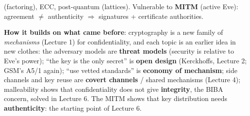 \begin{recapbox}[title={Exam-ready recap --- Lecture 5: Applied cryptography}]
\begin{itemize}
        (factoring), ECC, post-quantum (lattices). Vulnerable to \textbf{MITM} (active Eve):
        agreement $\neq$ authenticity $\Rightarrow$ signatures + certificate authorities.
\end{itemize}
\textbf{How it builds on what came before}: cryptography is a new family of \emph{mechanisms}
(Lecture 1) for confidentiality, and each topic is an earlier idea in new clothes: the adversary
models are \textbf{threat models} (security is relative to Eve's power); ``the key is the only
secret'' is \textbf{open design} (Kerckhoffs, Lecture 2; GSM's A5/1 again); ``use vetted
standards'' is \textbf{economy of mechanism}; side channels and key reuse are \textbf{covert
channels} / shared mechanisms (Lecture 4); malleability shows that confidentiality does not give
\textbf{integrity}, the BIBA concern, solved in Lecture 6. The MITM shows that key distribution
needs \textbf{authenticity}: the starting point of Lecture 6.
\end{recapbox}
